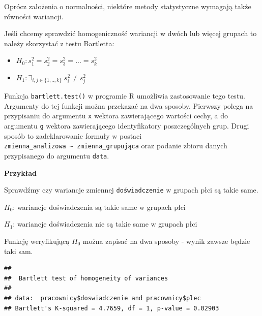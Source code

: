 \documentclass[
]{book}
\newenvironment{Shaded}{\begin{snugshade}}{\end{snugshade}}
\newcommand{\DataTypeTok}[1]{\textcolor[rgb]{0.13,0.29,0.53}{#1}}
\newcommand{\KeywordTok}[1]{\textcolor[rgb]{0.13,0.29,0.53}{\textbf{#1}}}
\newcommand{\NormalTok}[1]{#1}
\newcommand{\OperatorTok}[1]{\textcolor[rgb]{0.81,0.36,0.00}{\textbf{#1}}}
\newcommand{\StringTok}[1]{\textcolor[rgb]{0.31,0.60,0.02}{#1}}
\providecommand{\tightlist}{%
  \setlength{\itemsep}{0pt}\setlength{\parskip}{0pt}}
\begin{document}
Oprócz założenia o normalności, niektóre metody statystyczne wymagają także równości wariancji.

Jeśli chcemy sprawdzić homogeniczność wariancji w dwóch lub więcej grupach to należy skorzystać z testu Bartletta:

\begin{itemize}
\tightlist
\item
  \(H_0: s^2_1=s^2_2= s^2_3 =...=s^2_k\)
\item
  \(H_1: \exists_{i,j\in\{1,..,k\}} \; s^2_i \neq s^2_j\)
\end{itemize}

Funkcja \texttt{bartlett.test()} w programie R umożliwia zastosowanie tego testu. Argumenty do tej funkcji można przekazać na dwa sposoby. Pierwszy polega na przypisaniu do argumentu \texttt{x} wektora zawierającego wartości cechy, a do argumentu \texttt{g} wektora zawierającego identyfikatory poszczególnych grup. Drugi sposób to zadeklarowanie formuły w postaci \texttt{zmienna\_analizowa\ \textasciitilde{}\ zmienna\_grupująca} oraz podanie zbioru danych przypisanego do argumentu \texttt{data}.

\textbf{Przykład}

Sprawdźmy czy wariancje zmiennej \texttt{doświadczenie} w grupach płci są takie same.

\(H_0\): wariancje doświadczenia są takie same w grupach płci

\(H_1\): wariancje doświadczenia nie są takie same w grupach płci

Funkcję weryfikującą \(H_0\) można zapisać na dwa sposoby - wynik zawsze będzie taki sam.

\begin{Shaded}
\end{Shaded}

\begin{verbatim}
## 
##  Bartlett test of homogeneity of variances
## 
## data:  pracownicy$doswiadczenie and pracownicy$plec
## Bartlett's K-squared = 4.7659, df = 1, p-value = 0.02903
\end{verbatim}

\begin{Shaded}
\end{Shaded}
\end{document}

